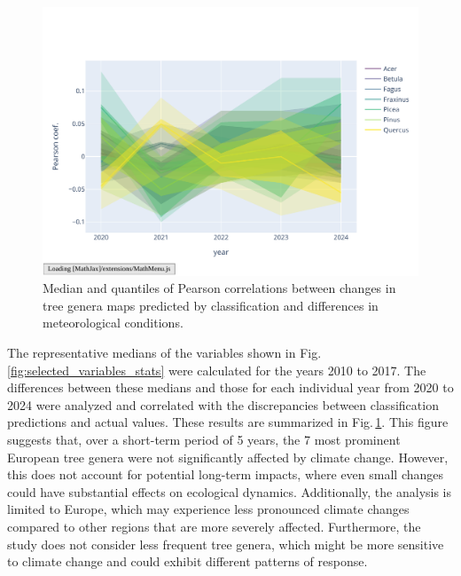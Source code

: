 \begin{figure}[ht]
    \centering
    \includegraphics[width=0.9\linewidth, trim={10pt 20pt 10pt 40pt}, clip]{figures/figures_climate/genus_corr.pdf}
    \caption{Median and quantiles of Pearson correlations between changes in tree genera maps predicted by classification and differences in meteorological conditions.}
    \label{fig:genus_corr}
\end{figure}

The representative medians of the variables shown in Fig.\,\ref{fig:selected_variables_stats} were calculated for the years 2010 to 2017. The differences between these medians and those for each individual year from 2020 to 2024 were analyzed and correlated with the discrepancies between classification predictions and actual values. These results are summarized in Fig.\,\ref{fig:genus_corr}. This figure suggests that, over a short-term period of 5 years, the 7 most prominent European tree genera were not significantly affected by climate change. However, this does not account for potential long-term impacts, where even small changes could have substantial effects on ecological dynamics. Additionally, the analysis is limited to Europe, which may experience less pronounced climate changes compared to other regions that are more severely affected. Furthermore, the study does not consider less frequent tree genera, which might be more sensitive to climate change and could exhibit different patterns of response.

